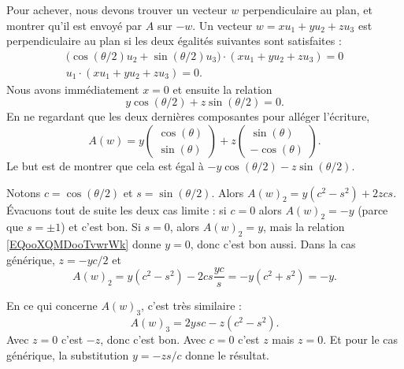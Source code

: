 \begin{subproof}
        Pour achever, nous devons trouver un vecteur \( w\) perpendiculaire au plan, et montrer qu'il est envoyé par \( A\) sur \( -w\). Un vecteur \( w=xu_1+yu_2+zu_3\) est perpendiculaire au plan si les deux égalités suivantes sont satisfaites :
        \begin{subequations}
            \begin{align}
                \big( \cos(\theta/2)u_2+\sin(\theta/2)u_3 \big)\cdot (xu_1+yu_2+zu_3)=0\\
                u_1\cdot(xu_1+yu_2+zu_3)=0.
            \end{align}
        \end{subequations}
        Nous avons immédiatement \( x=0\) et ensuite la relation
        \begin{equation}        \label{EQooXQMDooTvwrWk}
            y\cos(\theta/2)+z\sin(\theta/2)=0.
        \end{equation}
        En ne regardant que les deux dernières composantes pour alléger l'écriture,
        \begin{equation}
            A(w)=y\begin{pmatrix}
                \cos(\theta)    \\ 
                \sin(\theta)    
            \end{pmatrix}+z\begin{pmatrix}
                \sin(\theta)    \\ 
                -\cos(\theta)    
            \end{pmatrix}.
        \end{equation}
        Le but est de montrer que cela est égal à \( -y\cos(\theta/2)-z\sin(\theta/2)\).

        Notons \( c=\cos(\theta/2)\) et \( s=\sin(\theta/2)\). Alors \( A(w)_2=y(c^2-s^2)+2zcs\). Évacuons tout de suite les deux cas limite : si \( c=0\) alors \( A(w)_2=-y\) (parce que \( s=\pm1\)) et c'est bon. Si \( s=0\), alors \( A(w)_2=y\), mais la relation \eqref{EQooXQMDooTvwrWk} donne \( y=0\), donc c'est bon aussi. Dans la cas générique, \( z=-yc/2\) et
        \begin{equation}
            A(w)_2=y(c^2-s^2)-2cs\frac{ yc }{ s }=-y(c^2+s^2)=-y.
        \end{equation}

        En ce qui concerne \( A(w)_3\), c'est très similaire :
        \begin{equation}
            A(w)_3=2ysc-z(c^2-s^2).
        \end{equation}
        Avec \( z=0\) c'est \( -z\), donc c'est bon. Avec \( c=0\) c'est \( z\) mais \( z=0\). Et pour le cas générique, la substitution \( y=-zs/c\) donne le résultat.
        


\end{subproof}
